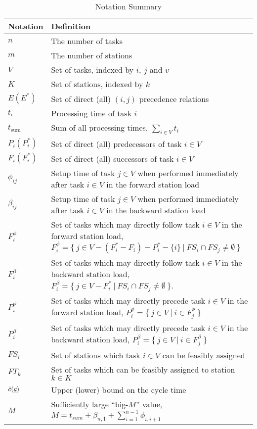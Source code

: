 \begin{table}[tbp]
	\def\arraystretch{1.1}
	\centering
	\caption{Notation Summary}
	\vspace{2mm}
	\begin{tabular}{lp{}}
		\toprule
		Notation & Definition  \\\midrule\midrule
		$n$ & The number of tasks\\
		$m$ & The number of stations\\
		$V$ & Set of tasks, indexed by $i$, $j$ and $v$ \\
		$K$ & Set of stations, indexed by $k$ \\
		$E (E^*)$ & Set of direct (all) $(i,j)$ precedence relations\\
		$t_i$ & Processing time of task $i$ \\
		$t_{\text{sum}}$ & Sum of all processing times, $\sum_{i\in V}t_i$ \\
		$P_i (P_i^*)$ & Set of direct (all) predecessors of task $i \in V$ \\
		$F_i (F_i^*)$ & Set of direct (all) successors of task $i \in V$ \\
		$\phi_{ij}$ & Setup time of task $j \in V$ when performed immediately after task $i \in V$ in the forward station load\\
		$\beta_{ij}$ & Setup time of task $j \in V$ when performed immediately after task $i \in V$ in the backward station load\\
		$F_i^\phi$ & Set of tasks which may directly follow task $i \in V$ in the forward station load,
					$F_i^\phi=\{\:j\in V- (F_i^*-F_i)-P_i^*-\{i\}\:|\: FS_i\cap FS_j \neq \emptyset\:\}$\\
		$F_i^\beta$ & Set of tasks which may directly follow task $i \in V$ in the backward station load,
					$F_i^\beta=\{\:j\in V- F_i^*\:|\: FS_i\cap FS_j \neq \emptyset\:\}$.\\
		$P_i^\phi$ & Set of tasks which may directly precede task $i \in V$ in the forward station load,
					$P_i^\phi=\{\: j \in V \:|\: i \in F_j^\phi \:\}$ \\
		$P_i^\beta$ & Set of tasks which may directly precede task $i \in V$ in the backward station load,
					$P_i^\beta=\{\: j \in V \:|\: i \in F_j^\beta \:\}$ \\
		$FS_i$ & Set of stations which task $i \in V$ can be feasibly assigned\\
		$FT_k$ & Set of tasks which can be feasibly assigned to station $k \in K$\\
		$\bar{c}(\underline{c})$ & Upper (lower) bound on the cycle time \\
		$M$ & Sufficiently large ``big-$M$'' value, $M=t_{sum} + \beta_{n,1} + \sum_{i=1}^{n-1} \phi_{i,i+1} $ \\
		\bottomrule
	\end{tabular}
	\label{tab:mipParams}
\end{table}

